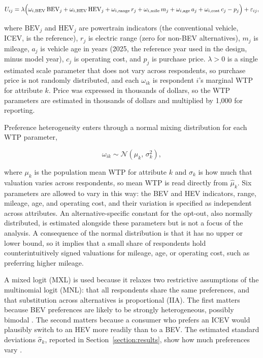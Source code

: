 \documentclass[a4paper,fleqn]{cas-sc}   %
\begin{document}
\begin{equation}
U_{ij} = \lambda \Bigl(\omega_{i,\mathrm{BEV}}\,\mathrm{BEV}_j + \omega_{i,\mathrm{HEV}}\,\mathrm{HEV}_j + \omega_{i,\mathrm{range}}\,r_j + \omega_{i,\mathrm{mile}}\,m_j + \omega_{i,\mathrm{age}}\,a_j + \omega_{i,\mathrm{cost}}\,c_j - p_j\Bigr) + \varepsilon_{ij},
\label{eq:wtp}
\end{equation}

\noindent where $\mathrm{BEV}_j$ and $\mathrm{HEV}_j$ are powertrain indicators (the conventional vehicle, ICEV, is the reference), $r_j$ is electric range (zero for non-BEV alternatives), $m_j$ is mileage, $a_j$ is vehicle age in years (2025, the reference year used in the design, minus model year), $c_j$ is operating cost, and $p_j$ is purchase price. $\lambda>0$ is a single estimated scale parameter that does not vary across respondents, so purchase price is not randomly distributed, and each $\omega_{ik}$ is respondent $i$'s marginal WTP for attribute $k$. Price was expressed in thousands of dollars, so the WTP parameters are estimated in thousands of dollars and multiplied by 1,000 for reporting.

Preference heterogeneity enters through a normal mixing distribution for each WTP parameter,

\begin{equation}
\omega_{ik} \sim \mathcal{N}(\mu_k,\, \sigma_k^2),
\label{eq:mixing}
\end{equation}

\noindent where $\mu_k$ is the population mean WTP for attribute $k$ and $\sigma_k$ is how much that valuation varies across respondents, so mean WTP is read directly from $\hat{\mu}_k$. Six parameters are allowed to vary in this way: the BEV and HEV indicators, range, mileage, age, and operating cost, and their variation is specified as independent across attributes. An alternative-specific constant for the opt-out, also normally distributed, is estimated alongside these parameters but is not a focus of the analysis. A consequence of the normal distribution is that it has no upper or lower bound, so it implies that a small share of respondents hold counterintuitively signed valuations for mileage, age, or operating cost, such as preferring higher mileage.

A mixed logit (MXL) is used because it relaxes two restrictive assumptions of the multinomial logit (MNL): that all respondents share the same preferences, and that substitution across alternatives is proportional (IIA). The first matters because BEV preferences are likely to be strongly heterogeneous, possibly bimodal \parencite{helveston2015subsidies}. The second matters because a consumer who prefers an ICEV would plausibly switch to an HEV more readily than to a BEV. The estimated standard deviations $\hat{\sigma}_k$, reported in Section~\ref{section:results}, show how much preferences vary \parencite{mcfaddenMixedMNLModels2000, trainDiscreteChoiceMethods2009}.
\end{document}
